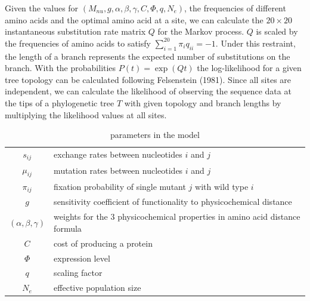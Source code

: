 \documentclass[13pt]{article}
\begin{document}
Given the values for $(M_{nu},g, \alpha, \beta, \gamma, C, \Phi, q, N_e)$, the frequencies of different amino acids and the optimal amino acid at a site, we can calculate the $20 \times 20$ instantaneous substitution rate matrix $Q$ for the Markov process. $Q$ is scaled by the frequencies of amino acids to satisfy $\sum_{i=1}^{20} \pi_i q_{ii}= -1$. Under this restraint, the length of a branch represents the expected number of substitutions on the branch. With the probabilities $P(t)  = \exp(Qt)$ the log-likelihood for a given tree topology can be calculated following Felsenstein (1981). Since all sites are independent, we can calculate the likelihood of observing the sequence data at the tips of a phylogenetic tree $T$ with given topology and branch lengths by multiplying the likelihood values at all sites.\\

\begin{table}[h]
\centering
\caption{parameters in the model}
\begin{tabular}{ c p{10cm} }
\hline
$s_{ij}$ & exchange rates between nucleotides $i$ and $j$ \\
$\mu_{ij}$ & mutation rates between nucleotides $i$ and $j$\\
$\pi_{ij}$ & fixation probability of single mutant $j$ with wild type $i$\\
$g$       & sensitivity coefficient of functionality to physicochemical distance \\
$(\alpha,\beta,\gamma)$ & weights for the 3 physicochemical properties in amino acid distance formula \\
$C$ & cost of producing a protein\\
$\Phi$ & expression level \\
$q$ & scaling factor \\
$N_e$ & effective population size \\
\hline
\end{tabular}

\label{tb: para}
\end{table}
\end{document}
